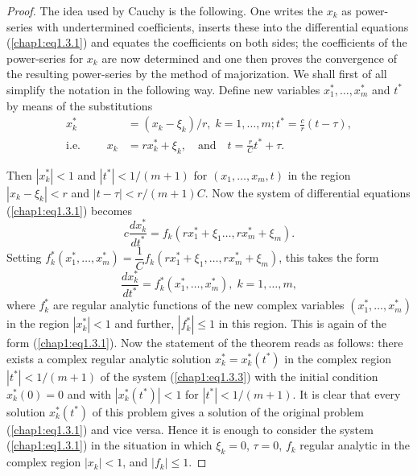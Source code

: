 \begin{proof}
The idea used by Cauchy is the following. One writes the $x_k$ as power-series with undertermined coefficients, inserts these into the differential equations (\ref{chap1:eq1.3.1}) and equates the coefficients on both sides; the coefficients of the power-series for $x_k$ are now determined and one then proves the convergence of the resulting power-series by the method of majorization. We shall first of all simplify the notation in the following way. Define new variables $x^*_1, \ldots, x^*_m$ and $t^*$ by means of the substitutions
\begin{align*}
x^*_k & = (x_k - \xi_k) / r, \; k =1 , \ldots, m; t^* = \frac{c}{r} (t-\tau),\\
\text{i.e. } \qquad x_k & = rx^*_k + \xi_k, \quad \text{and} \quad t = \frac{r}{C} t^* + \tau. 
\end{align*}

Then $|x^*_k| < 1$ and $|t^*|<1/(m+1)$ for $(x_1, \ldots, x_m, t)$ in the region $|x_k - \xi_k|<r$ and $|t-\tau| < r / (m+1)C$. Now the system of differential equations (\ref{chap1:eq1.3.1}) becomes 
$$
c \frac{dx^*_k}{dt^*} = f_k (rx^*_1 + \xi_1 \ldots, rx^*_m + \xi_m).
$$\pageoriginale
Setting $f^*_k (x^*_1, \ldots, x^*_m) = \dfrac{1}{C} f_k(r x^*_1 + \xi_1, \ldots, rx^*_m+ \xi_m)$, this takes the form
\begin{equation*}
\frac{dx^*_k}{dt^*} = f^*_k(x^*_1, \ldots, x^*_m), \; k =1 ,\ldots, m, \tag{1.3.3}\label{chap1:eq1.3.3}
\end{equation*}
where $f^*_k$ are regular analytic functions of the new complex variables $(x^*_1, \ldots, x^*_m)$ in the region $|x^*_k| <1$ and further, $|f^*_k| \leq 1$ in this region. This is again of the form (\ref{chap1:eq1.3.1}). Now the statement of the theorem reads as follows: there exists a complex regular analytic solution $x^*_k = x^*_k(t^*)$ in the complex region $|t^*| < 1 /(m+1)$ of the system (\ref{chap1:eq1.3.3}) with the initial condition $x^*_k (0) = 0$ and with $|x^*_k (t^*)| <1$ for $|t^*| < 1 /(m+1)$. It is clear that every solution $x^*_k(t^*)$ of this problem gives a solution of the original problem (\ref{chap1:eq1.3.1}) and vice versa. Hence it is enough to consider the system (\ref{chap1:eq1.3.1}) in the situation in which $\xi_k = 0$, $\tau =0$, $f_k$ regular analytic in the complex region $|x_k| < 1$, and $|f_k| \leq 1$.


\end{proof}
